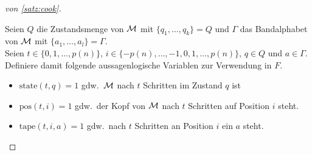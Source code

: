 {\begin{proof}[von \autoref{satz:cook}]
\begin{enumerate}
		Seien $Q$ die Zustandsmenge von $\mathcal{M}$ mit $\{q_1,\dots,q_k\}=Q$ und $\Gamma$ das Bandalphabet von $\mathcal{M}$ mit $\{a_1,\dots,a_l\} = \Gamma$.\\
		Seien $t\in\{0,1,\dots,p(n)\}$, $i\in\{-p(n),\dots,-1,0,1,\dots,p(n)\}$, $q \in Q$ und $a\in\Gamma$. \\
		Definiere damit folgende aussagenlogische Variablen zur Verwendung in $F$.
		\begin{itemize}
		\item $\mathrm{state}(t,q) = 1$ gdw.\ $\mathcal{M}$ nach $t$ Schritten im Zustand $q$ ist
		\item $\mathrm{pos}(t,i) = 1$ gdw.\ der Kopf von $\mathcal{M}$ nach $t$ Schritten auf Position $i$ steht.
		\item $\mathrm{tape}(t,i,a) = 1$ gdw.\ nach $t$ Schritten an Position $i$ ein $a$ steht.
		\end{itemize}
	\end{enumerate}

	\medskip


\end{proof}}

